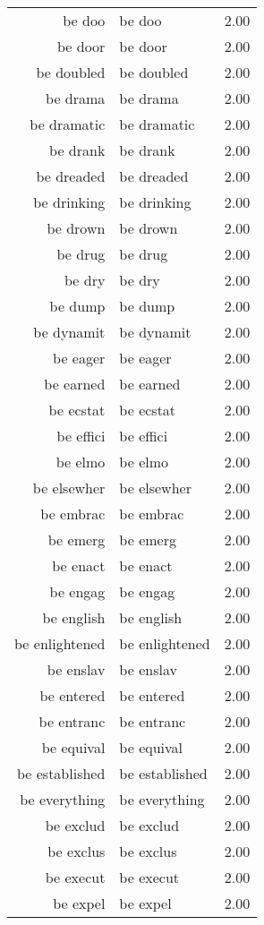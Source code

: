 \begin{table}[ht]
\begin{tabular}{rlr}
  be doo & be doo & 2.00 \\ 
  be door & be door & 2.00 \\ 
  be doubled & be doubled & 2.00 \\ 
  be drama & be drama & 2.00 \\ 
  be dramatic & be dramatic & 2.00 \\ 
  be drank & be drank & 2.00 \\ 
  be dreaded & be dreaded & 2.00 \\ 
  be drinking & be drinking & 2.00 \\ 
  be drown & be drown & 2.00 \\ 
  be drug & be drug & 2.00 \\ 
  be dry & be dry & 2.00 \\ 
  be dump & be dump & 2.00 \\ 
  be dynamit & be dynamit & 2.00 \\ 
  be eager & be eager & 2.00 \\ 
  be earned & be earned & 2.00 \\ 
  be ecstat & be ecstat & 2.00 \\ 
  be effici & be effici & 2.00 \\ 
  be elmo & be elmo & 2.00 \\ 
  be elsewher & be elsewher & 2.00 \\ 
  be embrac & be embrac & 2.00 \\ 
  be emerg & be emerg & 2.00 \\ 
  be enact & be enact & 2.00 \\ 
  be engag & be engag & 2.00 \\ 
  be english & be english & 2.00 \\ 
  be enlightened & be enlightened & 2.00 \\ 
  be enslav & be enslav & 2.00 \\ 
  be entered & be entered & 2.00 \\ 
  be entranc & be entranc & 2.00 \\ 
  be equival & be equival & 2.00 \\ 
  be established & be established & 2.00 \\ 
  be everything & be everything & 2.00 \\ 
  be exclud & be exclud & 2.00 \\ 
  be exclus & be exclus & 2.00 \\ 
  be execut & be execut & 2.00 \\ 
  be expel & be expel & 2.00 \\ 

\end{tabular}
\end{table}
